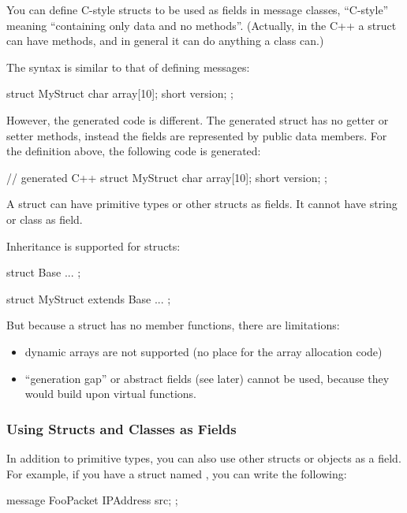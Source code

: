 You can define C-style structs to be used as fields in message classes,
``C-style'' meaning ``containing only data and no methods''.
(Actually, in the C++ a struct can have methods,
and in general it can do anything a class can.)

The syntax is similar to that of defining messages:

\begin{msg}
struct MyStruct
{
    char array[10];
    short version;
};
\end{msg}

However, the generated code is different. The generated struct has
no getter or setter methods, instead the fields are represented
by public data members. For the definition above, the
following code is generated:

\begin{cpp}
// generated C++
struct MyStruct
{
    char array[10];
    short version;
};
\end{cpp}

A struct can have primitive types or other structs as fields. It cannot
have string or class as field.

Inheritance is supported for structs:

\begin{msg}
struct Base
{
    ...
};

struct MyStruct extends Base
{
    ...
};
\end{msg}

But because a struct has no member functions, there are limitations:

\begin{itemize}
   \item dynamic arrays are not supported (no place for the array allocation code)
   \item ``generation gap'' or abstract fields (see later) cannot be used,
      because they would build upon virtual functions.
\end{itemize}


\subsubsection{Using Structs and Classes as Fields}

In addition to primitive types, you can also use other structs or objects
as a field. For example, if you have a struct named ,
you can write the following:

\begin{msg}
message FooPacket
{
    IPAddress src;
};
\end{msg}

